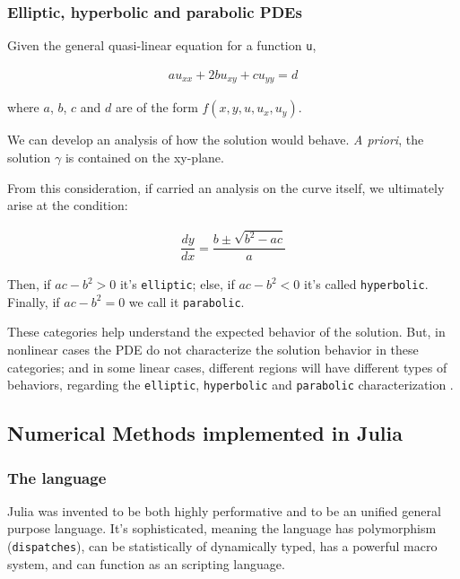 \documentclass[11pt]{article}
\begin{document}
\subsubsection{Elliptic, hyperbolic and parabolic PDEs}
\label{sec:orgc786b13}
Given the general quasi-linear equation for a function \texttt{u},

\begin{equation}
\label{eq:general-2th-order}
\begin{aligned}
au_{xx} + 2bu_{xy} + cu_{yy} = d
\end{aligned}
\end{equation}

where \(a\), \(b\), \(c\) and \(d\) are of the form \(f(x,y,u,u_x,u_y)\).

We can develop an analysis of how the solution would behave. \emph{A priori}, the
solution \(\gamma\) is contained on the xy-plane.

From this consideration, if carried an analysis on the curve itself, we
ultimately arise at the condition:

\begin{equation}
\begin{aligned}
\dfrac{dy}{dx} = \dfrac{b \pm \sqrt{b^2 -ac}}{a}
\end{aligned}
\end{equation}

Then, if \(ac-b^2>0\) it's \texttt{elliptic}; else, if \(ac-b^2<0\) it's called
\texttt{hyperbolic}. Finally, if \(ac-b^2=0\) we call it \texttt{parabolic}.

These categories help understand the expected behavior of the solution. But, in
nonlinear cases the PDE do not characterize the solution behavior in these
categories; and in some linear cases, different regions will have different
types of behaviors, regarding the \texttt{elliptic}, \texttt{hyperbolic} and \texttt{parabolic}
characterization \cite{john1978partial}.

\subsection{Numerical Methods implemented in Julia}
\label{sec:org9a7ee03}
\label{sec:num-julia}

\subsubsection{The language}
\label{sec:org938bb15}
Julia was invented to be both highly performative and to be an unified general
purpose language. It's sophisticated, meaning the language has polymorphism
(\texttt{dispatches}), can be statistically of dynamically typed, has a powerful macro
system, and can function as an scripting language.
\end{document}
